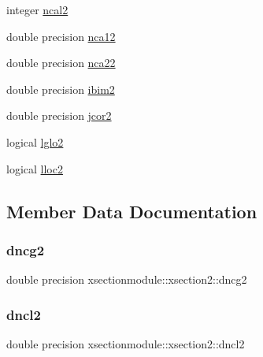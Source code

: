 \begin{DoxyCompactItemize}
\item 
integer \hyperlink{structxsectionmodule_1_1xsection2_aa56f6c6de554683228f3d88099c5f1ed}{ncal2}
\item 
double precision \hyperlink{structxsectionmodule_1_1xsection2_a1b04a538adb71a1f55199af785a0cb82}{nca12}
\item 
double precision \hyperlink{structxsectionmodule_1_1xsection2_ad502af62d4e0192cd514d163f7a0e209}{nca22}
\item 
double precision \hyperlink{structxsectionmodule_1_1xsection2_aef6c9319508f23c75d96d59c2500d891}{ibim2}
\item 
double precision \hyperlink{structxsectionmodule_1_1xsection2_a8dc16743761fcfec75c106efd6a8e752}{jcor2}
\item 
logical \hyperlink{structxsectionmodule_1_1xsection2_a3db27d6491989b6d31b7aeb06e607ffb}{lglo2}
\item 
logical \hyperlink{structxsectionmodule_1_1xsection2_a3c5dd0ac51f7d31a006628ff763203a5}{lloc2}
\end{DoxyCompactItemize}


\subsection{Member Data Documentation}
\mbox{\label{structxsectionmodule_1_1xsection2_aa7229154a3baa6fd81f2a19340364a99}} 
\subsubsection{\texorpdfstring{dncg2}{dncg2}}
{\footnotesize\ttfamily double precision xsectionmodule\+::xsection2\+::dncg2}

\mbox{\label{structxsectionmodule_1_1xsection2_a60064dfc8e4114d504489e56d4531453}} 
\subsubsection{\texorpdfstring{dncl2}{dncl2}}
{\footnotesize\ttfamily double precision xsectionmodule\+::xsection2\+::dncl2}

